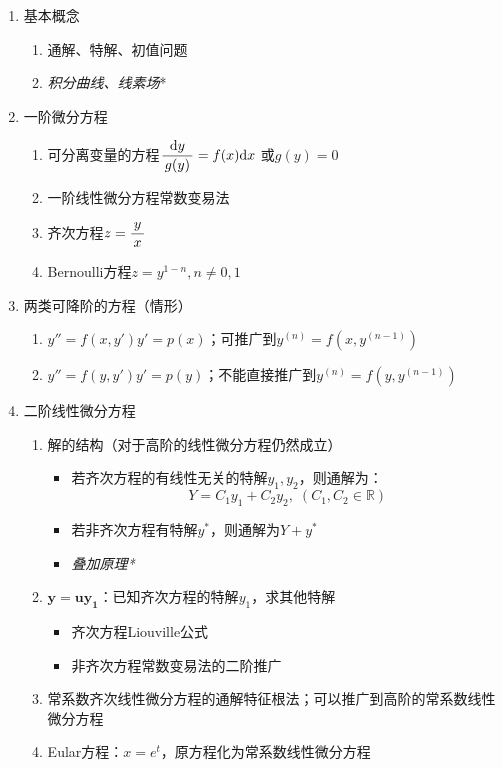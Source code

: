 \begin{enumerate}[1]
  \item 基本概念
  \begin{enumerate}[(1)]
    \item 通解、特解、初值问题
    \item {\it 积分曲线、线素场}*
  \end{enumerate}
  \item 一阶微分方程
  \begin{enumerate}[(1)]
    \item 可分离变量的方程\dotfill$\displaystyle\frac{\,{\mathrm{d} y}\,}{\,{g(y)}\,}=f(x)\mathrm{d} x$
    或$g(y)=0$
    \item 一阶线性微分方程\dotfill 常数变易法
    \item 齐次方程\dotfill$z=\displaystyle\frac{\,{y}\,}{\,{x}\,}$
    \item Bernoulli方程\dotfill$z=y^{1-n},n\ne0,1$
  \end{enumerate}
  \item 两类可降阶的方程（情形）
  \begin{enumerate}[(1)]
    \item $y''=f(x,y')$\dotfill$y'=p(x)$；可推广到$y^{(n)}=f(x,y^{(n-1)})$
    \item $y''=f(y,y')$\dotfill$y'=p(y)$；不能直接推广到$y^{(n)}=f(y,y^{(n-1)})$
  \end{enumerate}
  \item 二阶线性微分方程
  \begin{enumerate}[(1)]
    \item 解的结构（对于高阶的线性微分方程仍然成立）
    \begin{itemize}
      \item 若齐次方程的有线性无关的特解$y_1,y_2$，则通解为：
      $$Y=C_1y_1+C_2y_2,\;(C_1,C_2\in\mathbb{R})$$
      \item 若非齐次方程有特解$y^*$，则通解为$Y+y^*$
      \item {\it 叠加原理*}
    \end{itemize}
    \item $\bm{y=uy_1}$：已知齐次方程的特解$y_1$，求其他特解
    \begin{itemize}
      \item 齐次方程\dotfill Liouville公式
      \item 非齐次方程\dotfill 常数变易法的二阶推广
    \end{itemize}
    \item 常系数齐次线性微分方程的通解\dotfill 特征根法；可以推广到高阶的常系数线性微分方程
    \item Eular方程：\dotfill $x=e^t$，原方程化为常系数线性微分方程
  \end{enumerate}
\end{enumerate}

